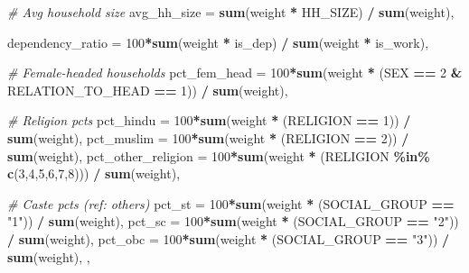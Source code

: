 \documentclass[
]{article}
\newenvironment{Shaded}{\begin{snugshade}}{\end{snugshade}}
\newcommand{\AttributeTok}[1]{\textcolor[rgb]{0.13,0.29,0.53}{#1}}
\newcommand{\CommentTok}[1]{\textcolor[rgb]{0.56,0.35,0.01}{\textit{#1}}}
\newcommand{\DecValTok}[1]{\textcolor[rgb]{0.00,0.00,0.81}{#1}}
\newcommand{\FunctionTok}[1]{\textcolor[rgb]{0.13,0.29,0.53}{\textbf{#1}}}
\newcommand{\NormalTok}[1]{#1}
\newcommand{\SpecialCharTok}[1]{\textcolor[rgb]{0.81,0.36,0.00}{\textbf{#1}}}
\newcommand{\StringTok}[1]{\textcolor[rgb]{0.31,0.60,0.02}{#1}}
\begin{document}
\begin{Shaded}
\begin{Highlighting}[]
    \CommentTok{\# Avg household size}
    \AttributeTok{avg\_hh\_size =} \FunctionTok{sum}\NormalTok{(weight }\SpecialCharTok{*}\NormalTok{ HH\_SIZE) }\SpecialCharTok{/} \FunctionTok{sum}\NormalTok{(weight),}
    
    \AttributeTok{dependency\_ratio =} \DecValTok{100}\SpecialCharTok{*}\FunctionTok{sum}\NormalTok{(weight }\SpecialCharTok{*}\NormalTok{ is\_dep) }\SpecialCharTok{/} \FunctionTok{sum}\NormalTok{(weight }\SpecialCharTok{*}\NormalTok{ is\_work),}
    
    \CommentTok{\# Female{-}headed households}
    \AttributeTok{pct\_fem\_head =} \DecValTok{100}\SpecialCharTok{*}\FunctionTok{sum}\NormalTok{(weight }\SpecialCharTok{*}\NormalTok{ (SEX }\SpecialCharTok{==} \DecValTok{2} \SpecialCharTok{\&}\NormalTok{ RELATION\_TO\_HEAD }\SpecialCharTok{==} \DecValTok{1}\NormalTok{)) }\SpecialCharTok{/} \FunctionTok{sum}\NormalTok{(weight),}
    
    \CommentTok{\# Religion pcts}
    \AttributeTok{pct\_hindu =} \DecValTok{100}\SpecialCharTok{*}\FunctionTok{sum}\NormalTok{(weight }\SpecialCharTok{*}\NormalTok{ (RELIGION }\SpecialCharTok{==} \DecValTok{1}\NormalTok{)) }\SpecialCharTok{/} \FunctionTok{sum}\NormalTok{(weight),}
    \AttributeTok{pct\_muslim =} \DecValTok{100}\SpecialCharTok{*}\FunctionTok{sum}\NormalTok{(weight }\SpecialCharTok{*}\NormalTok{ (RELIGION }\SpecialCharTok{==} \DecValTok{2}\NormalTok{)) }\SpecialCharTok{/} \FunctionTok{sum}\NormalTok{(weight),}
    \AttributeTok{pct\_other\_religion =} \DecValTok{100}\SpecialCharTok{*}\FunctionTok{sum}\NormalTok{(weight }\SpecialCharTok{*}\NormalTok{ (RELIGION }\SpecialCharTok{\%in\%} \FunctionTok{c}\NormalTok{(}\DecValTok{3}\NormalTok{,}\DecValTok{4}\NormalTok{,}\DecValTok{5}\NormalTok{,}\DecValTok{6}\NormalTok{,}\DecValTok{7}\NormalTok{,}\DecValTok{8}\NormalTok{))) }\SpecialCharTok{/} \FunctionTok{sum}\NormalTok{(weight),}
    
    \CommentTok{\# Caste pcts (ref: others)}
    \AttributeTok{pct\_st =} \DecValTok{100}\SpecialCharTok{*}\FunctionTok{sum}\NormalTok{(weight }\SpecialCharTok{*}\NormalTok{ (SOCIAL\_GROUP }\SpecialCharTok{==} \StringTok{"1"}\NormalTok{)) }\SpecialCharTok{/} \FunctionTok{sum}\NormalTok{(weight),}
    \AttributeTok{pct\_sc =} \DecValTok{100}\SpecialCharTok{*}\FunctionTok{sum}\NormalTok{(weight }\SpecialCharTok{*}\NormalTok{ (SOCIAL\_GROUP }\SpecialCharTok{==} \StringTok{"2"}\NormalTok{)) }\SpecialCharTok{/} \FunctionTok{sum}\NormalTok{(weight),}
    \AttributeTok{pct\_obc =} \DecValTok{100}\SpecialCharTok{*}\FunctionTok{sum}\NormalTok{(weight }\SpecialCharTok{*}\NormalTok{ (SOCIAL\_GROUP }\SpecialCharTok{==} \StringTok{"3"}\NormalTok{)) }\SpecialCharTok{/} \FunctionTok{sum}\NormalTok{(weight),}
\NormalTok{,}
    

\end{Highlighting}
\end{Shaded}
\end{document}
